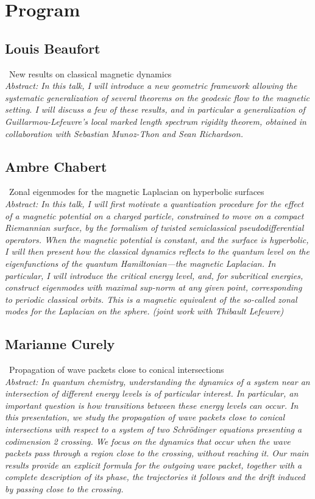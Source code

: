 \documentclass[12pt,a4paper]{amsart}
\begin{document}
\section*{Program}

\bigskip

\subsection*{Louis Beaufort} \, New results on classical magnetic dynamics \medskip \\
\textit{Abstract: In this talk, I will introduce a new geometric framework allowing the systematic generalization of several theorems on the geodesic flow to the magnetic setting. I will discuss a few of these results, and in particular a generalization of Guillarmou-Lefeuvre's local marked length spectrum rigidity theorem, obtained in collaboration with Sebastian Munoz-Thon and Sean Richardson.}

\bigskip

\subsection*{Ambre Chabert} \, Zonal eigenmodes for the magnetic Laplacian on hyperbolic surfaces \smallskip \\
\textit{Abstract: In this talk, I will first motivate a quantization procedure for the effect of a magnetic potential on a charged particle, constrained to move on a compact Riemannian surface, by the formalism of twisted semiclassical pseudodifferential operators. When the magnetic potential is constant, and the surface is hyperbolic, I will then present how the classical dynamics reflects to the quantum level on the eigenfunctions of the quantum Hamiltonian---the magnetic Laplacian. In particular, I will introduce the critical energy level, and, for subcritical energies, construct eigenmodes with maximal sup-norm at any given point, corresponding to periodic classical orbits. This is a magnetic equivalent of the so-called zonal modes for the Laplacian on the sphere. (joint work with Thibault Lefeuvre)}

\bigskip

\subsection*{Marianne Curely} \,  Propagation of wave packets close to conical intersections \smallskip \\
\textit{Abstract: In quantum chemistry, understanding the dynamics of a system near an intersection of different energy levels is of particular interest. In particular, an important question is how transitions between these energy levels can occur. In this presentation, we study the propagation of wave packets close to conical intersections with respect to a system of two Schrödinger equations presenting a codimension 2 crossing. We focus on the dynamics that occur when the wave packets pass through a region close to the crossing, without reaching it. Our main results provide an explicit formula for the outgoing wave packet,  together with a complete description of its phase, the trajectories it follows and the drift induced by passing close to the crossing.}
\end{document}
